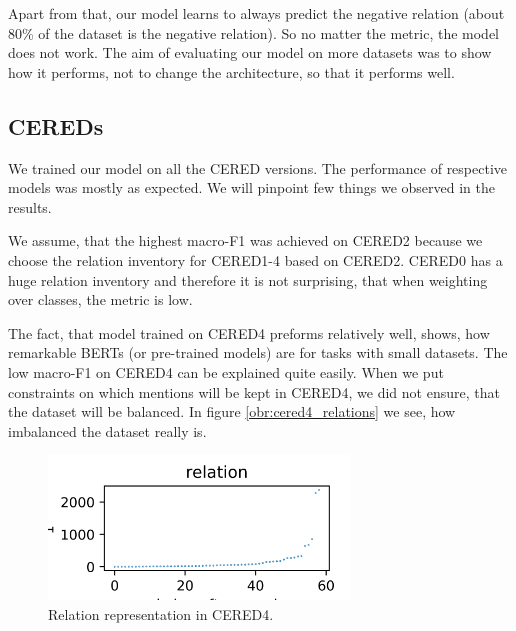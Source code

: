 Apart from that, our model learns to always predict the negative relation (about 80\% of the dataset is the negative relation). So no matter the metric, the model does not work. The aim of evaluating our model on more datasets was to show how it performs, not to change the architecture, so that it performs well.



\subsection{CEREDs}
We trained our model on all the CERED versions. The performance of respective models was mostly as expected.  We will pinpoint few things we observed in the results. 

We assume, that the highest macro-F1 was achieved on CERED2 because we choose the relation inventory for CERED1-4 based on CERED2. CERED0 has a huge relation inventory and therefore it is not surprising, that when weighting over classes, the metric is low.

The fact, that model trained on CERED4 preforms relatively well, shows, how remarkable BERTs (or pre-trained models) are for tasks with small datasets. The low macro-F1 on CERED4 can be explained quite easily. When we put constraints on which mentions will be kept in CERED4, we did not ensure, that the dataset will be balanced. In figure \autoref{obr:cered4_relations} we see, how imbalanced the dataset really is.


\begin{figure}[h]\centering
\includegraphics[width=80mm]{./img//CERED4_relations}
\caption{Relation representation in CERED4.}
\label{obr:cered4_relations}
\end{figure}



